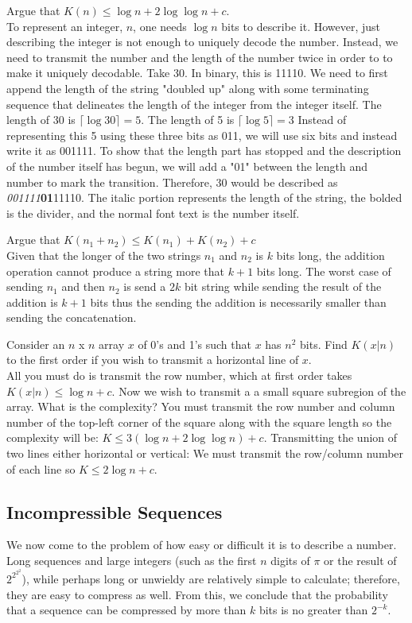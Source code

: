 \documentclass[11pt]{article}
\theoremstyle{definition}
\begin{document}
\example Argue that $K(n) \leq \log{n} + 2 \log{\log{n}} + c$.\\
To represent an integer, $n$, one needs $\log n$ bits to describe it. However, just describing the integer is not enough to uniquely decode the number. Instead, we need to transmit the number and the length of the number twice in order to to make it uniquely decodable. Take 30. In binary, this is 11110. We need to first append the length of the string "doubled up" along with some terminating sequence that delineates the length of the integer from the integer itself. The length of 30 is $\lceil{\log{30}}\rceil = 5$. The length of 5 is $\lceil{\log{5}}\rceil = 3$ Instead of representing this 5 using these three bits as 011, we will use six bits and instead write it as 001111. To show that the length part has stopped and the description of the number itself has begun, we will add a "01" between the length and number to mark the transition. Therefore, 30 would be described as {\it001111}{\bf 01}11110. The italic portion represents the length of the string, the bolded is the divider, and the normal font text is the number itself. 

\example Argue that $K(n_1 + n_2) \leq K(n_1) + K(n_2) + c$\\
Given that the longer of the two strings $n_1$ and $n_2$ is $k$ bits long, the addition operation cannot produce a string more that $k + 1$ bits long. The worst case of sending $n_1$ and then $n_2$ is send a $2k$ bit string while sending the result of the addition is $k + 1$ bits thus the sending the addition is necessarily smaller than sending the concatenation. 

\example Consider an $n$ x $n$ array $x$ of 0's and 1's such that $x$ has $n^2$ bits. Find $K(x|n)$ to the first order if you wish to transmit a horizontal line of $x$.\\
All you must do is transmit the row number, which at first order takes $K(x|n) \leq \log n + c$.
\example Now we wish to transmit a a small square subregion of the array. What is the complexity?
You must transmit the row number and column number of the top-left corner of the square along with the square length so the complexity will be:  $K \leq 3(\log{n} + 2 \log{\log{n}}) + c$.
\example Transmitting the union of two lines either horizontal or vertical: We must transmit the row/column number of each line so $K \leq 2 \log{n} + c$.

\subsection{Incompressible Sequences}
We now come to the problem of how easy or difficult it is to describe a number. Long sequences and large integers (such as the first $n$ digits of $\pi$ or the result of $2^{2^{2^2}}$), while perhaps long or unwieldy are relatively simple to calculate; therefore, they are easy to compress as well. From this, we conclude that the probability that a sequence can be compressed by more than $k$ bits is no greater than $2^{-k}$.
\end{document}
